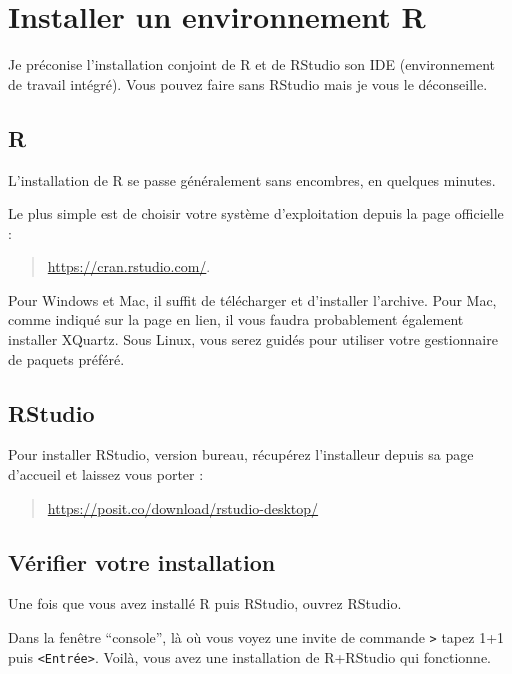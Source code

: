\documentclass[
  letterpaper,
  DIV=11,
  numbers=noendperiod]{scrreprt}
\begin{document}
\hypertarget{installer-un-environnement-r}{%
\chapter{Installer un environnement
R}\label{installer-un-environnement-r}}

Je préconise l'installation conjoint de R et de RStudio son IDE
(environnement de travail intégré). Vous pouvez faire sans RStudio mais
je vous le déconseille.

\hypertarget{r}{%
\section{R}\label{r}}

L'installation de R se passe généralement sans encombres, en quelques
minutes.

Le plus simple est de choisir votre système d'exploitation depuis la
page officielle :

\begin{quote}
\url{https://cran.rstudio.com/}.
\end{quote}

Pour Windows et Mac, il suffit de télécharger et d'installer l'archive.
Pour Mac, comme indiqué sur la page en lien, il vous faudra probablement
également installer XQuartz. Sous Linux, vous serez guidés pour utiliser
votre gestionnaire de paquets préféré.

\hypertarget{rstudio}{%
\section{RStudio}\label{rstudio}}

Pour installer RStudio, version bureau, récupérez l'installeur depuis sa
page d'accueil et laissez vous porter :

\begin{quote}
\href{\%5Bhttps://posit.co/download/rstudio-desktop/\%5D}{https://posit.co/download/rstudio-desktop/}
\end{quote}

\hypertarget{vuxe9rifier-votre-installation}{%
\section{Vérifier votre
installation}\label{vuxe9rifier-votre-installation}}

Une fois que vous avez installé R puis RStudio, ouvrez RStudio.

Dans la fenêtre ``console'', là où vous voyez une invite de commande
\texttt{\textgreater{}} tapez 1+1 puis
\texttt{\textless{}Entrée\textgreater{}}. Voilà, vous avez une
installation de R+RStudio qui fonctionne.
\end{document}
